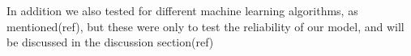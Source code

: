 In addition we also tested for different machine learning algorithms, as mentioned(ref), but these were only to test the reliability of our model, and will be discussed in the discussion section(ref) 





\begin{comment}
\myworries{This is in the intro.}
The original plan was to make a model that could predict Ionic conductivity for potential solid state electrolytes but after gathering and searching for information we found this article (REF:) by Sendek: Were they could not find a sufficient amount of data on ionic conductivity for a proper model to be created, or rather, they only found 40 materials that they used to make their prediction on ionic conductivity, something that our group deemed far to little for a proper prediction, even if we added the $ 40$ that we found from our own search. 

We then tried to use the materialsproject's database (MPDB), which resulted in a change of focus from electrolytes to electrodes, due to the nature of that database and ML's demand for as much relevant data as possible.

The MPDB included much information on electrodes that came to good use. First and foremost an organized list over reduction cell formulas, CIF files and Voltage pair properties, including, but not limited to; Energy above hull as an indicator of stability, Volume change of the battery, Capacity, both gravimetric and volumetric, and Voltage - of the specific pair. All of these are of interest to our model both as predictors and targets. 

We wrote a highly versatile code that can easily run a random forest algorithm on whatever we deem fit as a target with what predictors to use. (see section; 'Random forest')

From the CIF files we calculated the number density\myworries{ref?}, for both the charged and discharged - materials, which is the number of one particular atom in the unit cell and dividing it by the volume of the unit cell so that we could feed our machine with something that represented the density in a meaningful way, in the case that the machine would find any correlation between this and any of the chosen targets. Which it did. 
\end{comment}


\pagebreak

